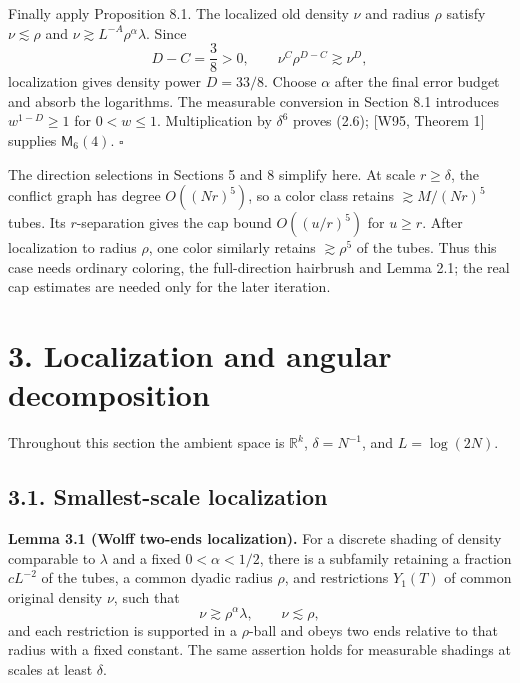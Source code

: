 \documentclass[
  11pt,
  a4paper,
]{article}
\begin{document}
Finally apply Proposition 8.1. The localized old density \(\nu\) and
radius \(\rho\) satisfy \(\nu\lesssim\rho\) and
\(\nu\gtrsim L^{-A}\rho^\alpha\lambda\). Since \[
 D-C=\frac38>0,
 \qquad \nu^C\rho^{D-C}\gtrsim\nu^D,
\] localization gives density power \(D=33/8\). Choose \(\alpha\) after
the final error budget and absorb the logarithms. The measurable
conversion in Section 8.1 introduces \(w^{1-D}\ge1\) for \(0<w\le1\).
Multiplication by \(\delta^6\) proves (2.6); {[}W95, Theorem 1{]}
supplies \(\mathsf M_6(4)\). \(\square\)

The direction selections in Sections 5 and 8 simplify here. At scale
\(r\ge\delta\), the conflict graph has degree \(O((Nr)^5)\), so a color
class retains \(\gtrsim M/(Nr)^5\) tubes. Its \(r\)-separation gives the
cap bound \(O((u/r)^5)\) for \(u\ge r\). After localization to radius
\(\rho\), one color similarly retains \(\gtrsim\rho^5\) of the tubes.
Thus this case needs ordinary coloring, the full-direction hairbrush and
Lemma 2.1; the real cap estimates are needed only for the later
iteration.

\hypertarget{localization-and-angular-decomposition}{%
\section{3. Localization and angular
decomposition}\label{localization-and-angular-decomposition}}

Throughout this section the ambient space is \(\mathbb R^k\),
\(\delta=N^{-1}\), and \(L=\log(2N)\).

\hypertarget{smallest-scale-localization}{%
\subsection{3.1. Smallest-scale
localization}\label{smallest-scale-localization}}

\textbf{Lemma 3.1 (Wolff two-ends localization).} For a discrete shading
of density comparable to \(\lambda\) and a fixed \(0<\alpha<1/2\), there
is a subfamily retaining a fraction \(cL^{-2}\) of the tubes, a common
dyadic radius \(\rho\), and restrictions \(Y_1(T)\) of common original
density \(\nu\), such that \[\nu\gtrsim\rho^\alpha\lambda,\qquad
 \nu\lesssim\rho,
 \tag{3.1}\label{eq:3.1}\] and each restriction is supported in a \(\rho\)-ball and
obeys two ends relative to that radius with a fixed constant. The same
assertion holds for measurable shadings at scales at least \(\delta\).
\end{document}
